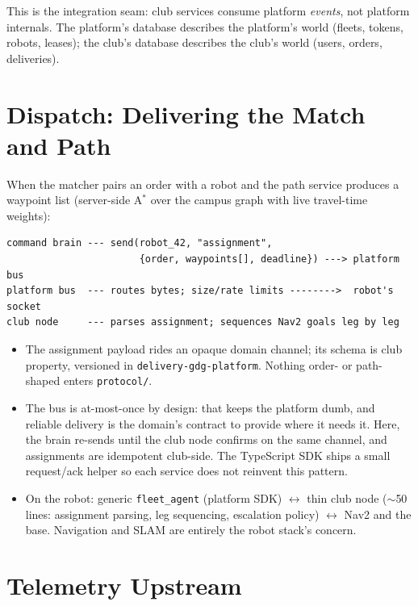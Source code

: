 \documentclass[11pt]{article}
\begin{document}
This is the integration seam: club services consume platform \emph{events}, not
platform internals. The platform's database describes the platform's world (fleets,
tokens, robots, leases); the club's database describes the club's world (users, orders,
deliveries).

\section{Dispatch: Delivering the Match and Path}

When the matcher pairs an order with a robot and the path service produces a waypoint
list (server-side A$^{*}$ over the campus graph with live travel-time weights):

\begin{lstlisting}
command brain --- send(robot_42, "assignment",
                       {order, waypoints[], deadline}) ---> platform bus
platform bus  --- routes bytes; size/rate limits -------->  robot's socket
club node     --- parses assignment; sequences Nav2 goals leg by leg
\end{lstlisting}

\begin{itemize}[itemsep=1pt]
  \item The assignment payload rides an opaque domain channel; its schema is club
        property, versioned in \texttt{delivery-gdg-platform}. Nothing order- or
        path-shaped enters \texttt{protocol/}.
  \item The bus is at-most-once by design: that keeps the platform dumb, and
        reliable delivery is the domain's contract to provide where it needs it.
        Here, the brain re-sends until the club node confirms on the same channel,
        and assignments are idempotent club-side. The TypeScript SDK ships a small
        request/ack helper so each service does not reinvent this pattern.
  \item On the robot: generic \texttt{fleet\_agent} (platform SDK) $\leftrightarrow$
        thin club node ($\sim$50 lines: assignment parsing, leg sequencing, escalation
        policy) $\leftrightarrow$ Nav2 and the base. Navigation and SLAM are entirely
        the robot stack's concern.
\end{itemize}

\section{Telemetry Upstream}
\end{document}
